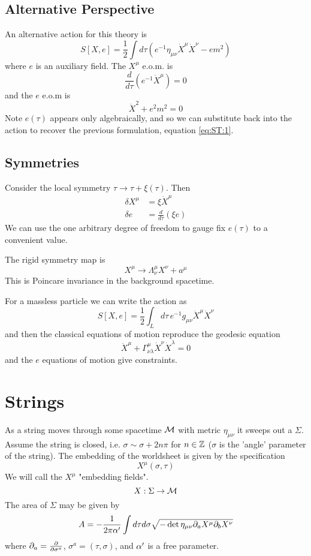 \documentclass{article}
\begin{document}
\subsection{Alternative Perspective}
An alternative action for this theory is 
\[
S[X,e]=\frac{1}{2} \int d\tau (e^{-1} \eta_{\mu\nu} \dot{X}^\mu \dot{X}^\nu - em^2 )
\]
where $e$ is an auxiliary field. The $X^\mu$ e.o.m. is 
\[
\frac{d}{d\tau}(e^{-1} \dot{X}^\mu ) = 0 
\]
and the $e$ e.o.m is 
\[
\dot{X}^2 + e^2m^2=0
\]
Note $e(\tau)$ appears only algebraically, and so we can substitute back into the action to recover the previous formulation, equation \ref{eq:ST:1}. \\

\subsection{Symmetries}
Consider the local symmetry $\tau \to \tau + \xi(\tau)$. Then 
\begin{align}
    \delta X^\mu &= \xi \dot{X}^\mu \\
    \delta e &= \frac{d}{d\tau}(\xi e) 
\end{align}
We can use the one arbitrary degree of freedom to gauge fix $e(\tau)$ to a convenient value. 

\begin{definition}
The rigid symmetry map is 
\[
X^\mu \to \Lambda^\mu_\nu X^\nu + a^\mu
\]
This is Poincare invariance in the background spacetime. \end{definition}
For a massless particle we can write the action as 
\[
S[X,e] = \frac{1}{2} \int_L d\tau \, e^{-1} g_{\mu\nu} \dot{X}^\mu \dot{X}^\nu
\]
and then the classical equations of motion reproduce the geodesic equation 
\[
\ddot{X}^\mu + \Gamma^{\mu}_{\nu\lambda} \dot{X}^\nu \dot{X}^\lambda = 0
\]
and the $e$ equations of motion give constraints. 

\section{Strings}
As a string moves through some spacetime $\mathcal{M}$ with metric $\eta_{\mu\nu}$ it sweeps out a  $\Sigma$. Assume the string is closed, i.e. $\sigma \sim \sigma+2n\pi$ for $n\in\mathbb{Z}$ ($\sigma$ is the 'angle' parameter of the string). The embedding of the worldsheet is given by the specification 
\[
X^\mu (\sigma,\tau)
\]
We will call the $X^\mu$ "embedding fields". 
\[
X : \Sigma \to \mathcal{M}
\]
The area of $\Sigma$ may be given by 
\[
A = -\frac{1}{2\pi \alpha^\prime} \int d\tau d\sigma \sqrt{-\det{\eta_{\mu\nu}\partial_a X^\mu \partial_b X^\nu}}
\]
where $\partial_a = \frac{\partial}{\partial\sigma^a}$, $\sigma^a = (\tau, \sigma)$, and $\alpha^\prime$ is a free parameter.
\end{document}

